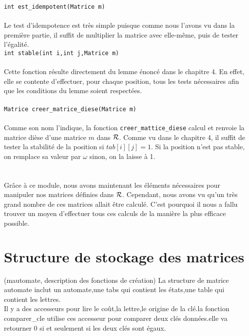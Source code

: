 \documentclass{report}
\begin{document}
\verb?int est_idempotent(Matrice m)?\\\\
Le test d'idempotence est très simple puisque comme nous l'avons vu dans la première partie, il suffit de multiplier la matrice avec elle-même, puis de tester l'égalité.\\

\verb?int stable(int i,int j,Matrice m)?\\\\
Cette fonction résulte directement du lemme énoncé dans le chapitre 4. En effet, elle se contente d'effectuer, pour chaque position, tous les tests nécessaires afin que les conditions du lemme soient respectées.\\\\

\verb?Matrice creer_matrice_diese(Matrice m)?\\\\
Comme son nom l'indique, la fonction \verb?creer_mattice_diese? calcul et renvoie la matrice dièse d'une matrice $m$ dans $\mathcal{R}$. Comme vu dans le chapitre 4, il suffit de tester la stabilité de la position si $tab[i][j] = 1$. Si la position n'est pas stable, on remplace sa valeur par $\omega$ sinon, on la laisse à 1.\\\\\\

Grâce à ce module, nous avons maintenant les éléments nécessaires pour manipuler nos matrices définies dans $\mathcal{R}$. Cependant, nous avons vu qu'un très grand nombre de ces matrices allait être calculé. C'est pourquoi il nous a fallu trouver un moyen d'effectuer tous ces calculs de la manière la plus efficace possible.

\chapter{Structure de stockage des matrices}

(mautomate, description des fonctions de création)
La structure de matrice automate inclut un automate,une tabs qui contient les états,une table qui contient les lettres.\\

Il y a des accesseurs pour lire le coût,la lettre,le origine de la clé.la fonction comparer\_cle utilise ces accesseur pour comparer deux clés données.elle va retourner 0 si et seulement si les deux clés sont égaux.\\
\end{document}
